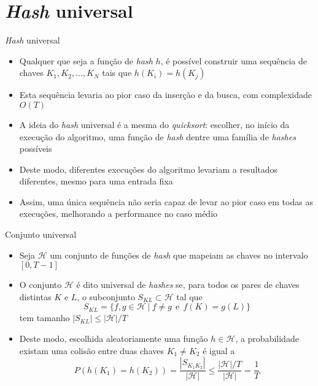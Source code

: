 \section{{\it Hash} universal}

\begin{frame}[fragile]{{\it Hash} universal}

    \begin{itemize}
        \item Qualquer que seja a função de  \textit{hash} $h$, é possível construir uma
            sequência de chaves $K_1, K_2, \ldots, K_N$ tais que $h(K_i) = h(K_j)$

        \item Esta sequência levaria ao pior caso da inserção e da busca, com complexidade
            $O(T)$

        \item A ideia do \textit{hash} universal é a mesma do \textit{quicksort}: escolher,
            no início da execução do algoritmo, uma função de \textit{hash} dentre uma 
            família de \textit{hashes} possíveis

        \item Deste modo, diferentes execuções do algoritmo levariam a resultados diferentes,
            mesmo para uma entrada fixa

        \item Assim, uma única sequência não seria capaz de levar ao pior caso em todas as
            execuções, melhorando a performance no caso médio
             
    \end{itemize}

\end{frame}

\begin{frame}[fragile]{Conjunto universal}

    \begin{itemize}
        \item Seja $\mathcal{H}$ um conjunto de funções de \textit{hash} que mapeiam as chaves
            no intervalo $[0, T -1]$

        \item O conjunto $\mathcal{H}$ é dito universal de \textit{hashes} se, para todos os pares 
            de chaves distintas $K$ e $L$, o subconjunto $S_{KL}\subset \mathcal{H}$ tal que
            \[
                S_{KL} = \lbrace f, g\in\mathcal{H}\ |\ f\neq g \ \ \mbox{e}\ \ f(K) = g(L)\rbrace
            \]
            tem tamanho $|S_{KL}| \leq |\mathcal{H}|/T$

        \item Deste modo, escolhida aleatoriamente uma função $h\in\mathcal{H}$, a probabilidade 
            existam uma colisão entre duas chaves $K_1\neq K_2$ é igual a
            \[
                P(h(K_1) = h(K_2)) = \frac{|S_{K_1K_2}|}{|\mathcal{H}|} \leq \frac{|\mathcal{H}|/T}{|\mathcal{H}|} = \frac{1}{T}
            \]

    \end{itemize}

\end{frame}

